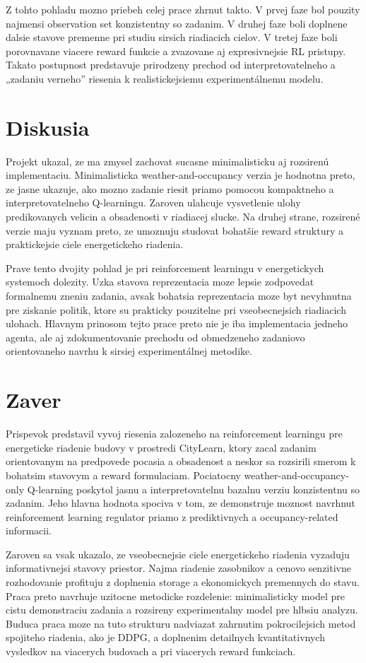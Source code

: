 \documentclass[conference]{IEEEtran}
\begin{document}
Z tohto pohladu mozno priebeh celej prace zhrnut takto. V prvej faze bol pouzity najmensi observation set konzistentny so zadanim. V druhej faze boli doplnene dalsie stavove premenne pri studiu sirsich riadiacich cielov. V tretej faze boli porovnavane viacere reward funkcie a zvazovane aj expresivnejsie RL pristupy. Takato postupnost predstavuje prirodzeny prechod od interpretovatelneho a „zadaniu verneho” riesenia k realistickejsiemu experimentálnemu modelu.

\section{Diskusia}
Projekt ukazal, ze ma zmysel zachovat sucasne minimalisticku aj rozsirenú implementaciu. Minimalisticka weather-and-occupancy verzia je hodnotna preto, ze jasne ukazuje, ako mozno zadanie riesit priamo pomocou kompaktneho a interpretovatelneho Q-learningu. Zaroven ulahcuje vysvetlenie ulohy predikovanych velicin a obsadenosti v riadiacej slucke. Na druhej strane, rozsirené verzie maju vyznam preto, ze umoznuju studovat bohatšie reward struktury a praktickejsie ciele energetickeho riadenia.

Prave tento dvojity pohlad je pri reinforcement learningu v energetickych systemoch dolezity. Uzka stavova reprezentacia moze lepsie zodpovedat formalnemu zneniu zadania, avsak bohatsia reprezentacia moze byt nevyhnutna pre ziskanie politik, ktore su prakticky pouzitelne pri vseobecnejsich riadiacich ulohach. Hlavnym prinosom tejto prace preto nie je iba implementacia jedneho agenta, ale aj zdokumentovanie prechodu od obmedzeneho zadaniovo orientovaneho navrhu k sirsiej experimentálnej metodike.

\section{Zaver}
Prispevok predstavil vyvoj riesenia zalozeneho na reinforcement learningu pre energeticke riadenie budovy v prostredi CityLearn, ktory zacal zadanim orientovanym na predpovede pocasia a obsadenost a neskor sa rozsirili smerom k bohatsim stavovym a reward formulaciam. Pociatocny weather-and-occupancy-only Q-learning poskytol jasnu a interpretovatelnu bazalnu verziu konzistentnu so zadanim. Jeho hlavna hodnota spociva v tom, ze demonstruje moznost navrhnut reinforcement learning regulator priamo z prediktivnych a occupancy-related informacii.

Zaroven sa vsak ukazalo, ze vseobecnejsie ciele energetickeho riadenia vyzaduju informativnejsi stavovy priestor. Najma riadenie zasobnikov a cenovo senzitivne rozhodovanie profituju z doplnenia storage a ekonomickych premennych do stavu. Praca preto navrhuje uzitocne metodicke rozdelenie: minimalisticky model pre cistu demonstraciu zadania a rozsireny experimentalny model pre hlbsiu analyzu. Buduca praca moze na tuto strukturu nadviazat zahrnutim pokrocilejsich metod spojiteho riadenia, ako je DDPG, a doplnenim detailnych kvantitativnych vysledkov na viacerych budovach a pri viacerych reward funkciach.
\end{document}
